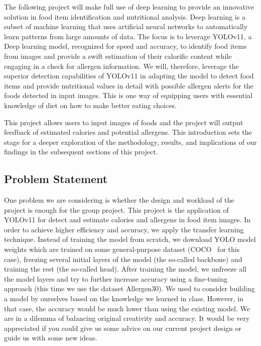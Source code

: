 \documentclass[10pt,twocolumn,letterpaper]{article}
\begin{document}
The following project will make full use of deep learning to provide an innovative solution in food item identification and nutritional analysis. 
Deep learning is a subset of machine learning that uses artificial neural networks to automatically learn patterns from large amounts of data.
The focus is to leverage YOLOv11\cite{redmon2016lookonceunifiedrealtime}, a Deep learning model, recognized for speed and accuracy, to identify food items from images and provide a swift estimation of their calorific content while engaging in a check for allergen information. 
We will, therefore, leverage the superior detection capabilities of YOLOv11 in adapting the model to detect food items and provide nutritional values in detail with possible allergen alerts for the foods detected in input images. 
This is one way of equipping users with essential knowledge of diet on how to make better eating choices.

This project allows users to input images of foods and the project will output feedback of estimated calories and potential allergens.
This introduction sets the stage for a deeper exploration of the methodology, results, and implications of our findings in the subsequent sections of this project.

\subsection{Problem Statement}

One problem we are considering is whether the design and workload of the project is enough for the group project.
This project is the application of YOLOv11 for detect and estimate calories and allergens in food item images.
In order to achieve higher efficiency and accuracy, we apply the transfer learning technique.
Instead of training the model from scratch, we download YOLO model weights which are trained on some general-purpose dataset (COCO~\cite{lin2015microsoftcococommonobjects} for this case), freezing several initial layers of the model (the so-called backbone) and training the rest (the so-called head).
After training the model, we unfreeze all the model layers and try to further increase accuracy using a fine-tuning approach (this time we use the dataset Allergen30).
We used to consider building a model by ourselves based on the knowledge we learned in class.
However, in that case, the accuracy would be much lower than using the existing model.
We are in a dilemma of balancing original creativity and accuracy.
It would be very appreciated if you could give us some advice on our current project design or guide us with some new ideas. 
\end{document}
